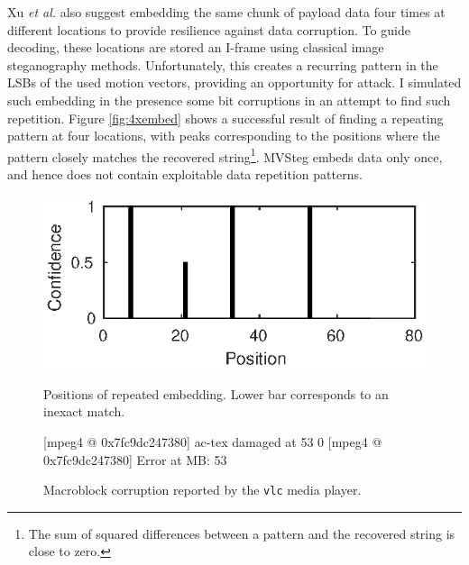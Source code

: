 \documentclass[12pt,british,twoside,notitlepage,usenames,dvipsnames,hypens,final]{report}
\numberwithin{equation}{section}
\numberwithin{figure}{section}
\renewenvironment{alltt}{\vspace{-0.6\baselineskip}\begin{oldalltt}}{\end{oldalltt}\vspace{-0.1\baselineskip}}
\begin{document}
Xu \emph{et al.} also suggest embedding the same chunk of payload data four times at different locations to provide resilience against data corruption. To guide decoding, these locations are stored an I-frame using classical image steganography methods. Unfortunately, this creates a recurring pattern in the LSBs of the used motion vectors, providing an opportunity for attack. I simulated such embedding in the presence some bit corruptions in an attempt to find such repetition. Figure \ref{fig:4xembed} shows a successful result of finding a repeating pattern at four locations, with peaks corresponding to the positions where the pattern closely matches the recovered string\footnote{The sum of squared differences between a pattern and the recovered string is close to zero.}. MVSteg embeds data only once, and hence does not contain exploitable data repetition patterns.

\begin{figure}[tbh]
\centering
\begin{minipage}[t]{.45\textwidth}
  \centering
  \includegraphics[scale=0.9]{img/4xembed.eps}
  \caption{Positions of repeated embedding. Lower bar corresponds to an inexact match.}
  \label{fig:4xembed}
\end{minipage}%
\quad
\begin{minipage}[t]{.45\textwidth}
  \vspace{-5.14em}
  \begingroup
    \fontsize{11pt}{12pt}\selectfont
    \centering
    \begin{alltt}
 {\color{blue}[mpeg4 @ 0x7fc9dc247380]}
            {\color{red}ac-tex damaged at 53 0}
 {\color{blue}[mpeg4 @ 0x7fc9dc247380]}
                   {\color{red}Error at MB: 53}

    \end{alltt}
  \endgroup
  \caption{Macroblock corruption reported by the \texttt{vlc} media player.}
  \label{fig:vlc-corruption}
\end{minipage}
\end{figure}
\end{document}
